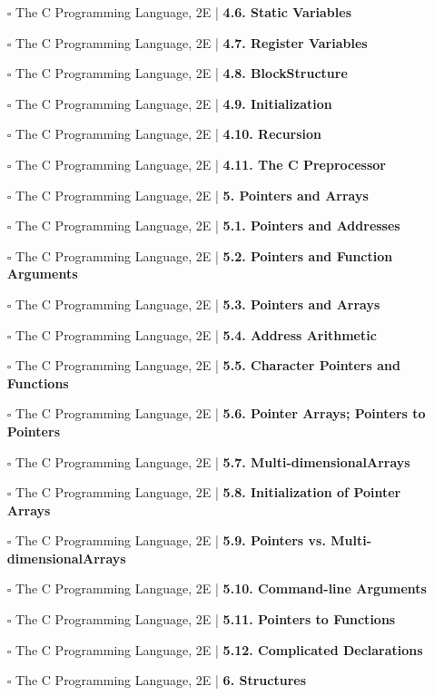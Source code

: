 \documentclass[a4, landscape, 12pt]{article}
\newcommand{\checkbox}{$\square$}%
\begin{document}
\begin{itemize}
{}
\item [\checkbox]  The C Programming Language, 2E | \textbf{ 4.6. Static Variables
}
\item [\checkbox]  The C Programming Language, 2E | \textbf{ 4.7. Register Variables
}
\item [\checkbox]  The C Programming Language, 2E | \textbf{ 4.8. BlockStructure
}
\item [\checkbox]  The C Programming Language, 2E | \textbf{ 4.9. Initialization
}
\item [\checkbox]  The C Programming Language, 2E | \textbf{ 4.10. Recursion
}
\item [\checkbox]  The C Programming Language, 2E | \textbf{ 4.11. The C Preprocessor
}
\item [\checkbox]  The C Programming Language, 2E | \textbf{ 5. Pointers and Arrays
}
\item [\checkbox]  The C Programming Language, 2E | \textbf{ 5.1. Pointers and Addresses
}
\item [\checkbox]  The C Programming Language, 2E | \textbf{ 5.2. Pointers and Function Arguments
}
\item [\checkbox]  The C Programming Language, 2E | \textbf{ 5.3. Pointers and Arrays
}
\item [\checkbox]  The C Programming Language, 2E | \textbf{ 5.4. Address Arithmetic
}
\item [\checkbox]  The C Programming Language, 2E | \textbf{ 5.5. Character Pointers and Functions
}
\item [\checkbox]  The C Programming Language, 2E | \textbf{ 5.6. Pointer Arrays; Pointers to Pointers
}
\item [\checkbox]  The C Programming Language, 2E | \textbf{ 5.7. Multi-dimensionalArrays
}
\item [\checkbox]  The C Programming Language, 2E | \textbf{ 5.8. Initialization of Pointer Arrays
}
\item [\checkbox]  The C Programming Language, 2E | \textbf{ 5.9. Pointers vs. Multi-dimensionalArrays
}
\item [\checkbox]  The C Programming Language, 2E | \textbf{ 5.10. Command-line Arguments
}
\item [\checkbox]  The C Programming Language, 2E | \textbf{ 5.11. Pointers to Functions
}
\item [\checkbox]  The C Programming Language, 2E | \textbf{ 5.12. Complicated Declarations
}
\item [\checkbox]  The C Programming Language, 2E | \textbf{ 6. Structures
}
\end{itemize}
\end{document}
